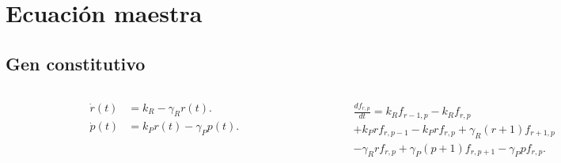 \documentclass[xcolor=dvipsnames]{beamer}
\begin{document}
\section{Ecuaci\'on maestra}
\subsection{Gen constitutivo}
\begin{frame}
\begin{columns}[c]
\begin{figure}[p]
    \centering
    \includegraphics[width=\textwidth]{Pmas-dogma}
\end{figure}
\begin{align*}
\dot{r}(t) &= k_R - \gamma_Rr(t).\\
\dot{p}(t) &= k_Pr(t) - \gamma_Pp(t).
\end{align*}
\begin{figure}[p]
    \centering
    \includegraphics[width=\textwidth]{Pmas-trans_single}
\end{figure}
\begin{align*}
&\frac{d{f}_{r,p}}{dt} = k_Rf_{r-1,p} - k_Rf_{r,p}\\
&+ k_Prf_{r,p-1} - k_Prf_{r,p} + \gamma_R(r+1)f_{r+1,p}\\
&- \gamma_Rrf_{r,p} + \gamma_P(p+1)f_{r,p+1} - \gamma_Ppf_{r,p}.
\end{align*}
\end{columns}
\end{frame}
\end{document}
